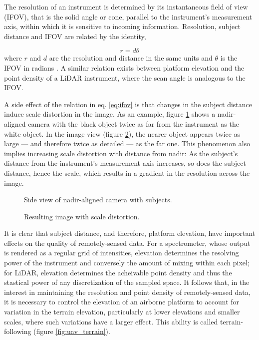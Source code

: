 \documentclass[10pt,a4paper]{report}
\begin{document}
The resolution of an instrument is determined by its instantaneous field of view (IFOV), that is the solid angle or cone, parallel to the instrument's measurement axis, within which it is sensitive to incoming information. Resolution, subject distance and IFOV are related by the identity, 

\begin{equation}
r = d \theta
\label{eq:ifov}
\end{equation} 
where $r$ and $d$ are the resolution and distance in the same units and $\theta$ is the IFOV in radians \cite{Lillesand1999}. A similar relation exists between platform elevation and the point density of a LiDAR instrument, where the scan angle is analogous to the IFOV. 

A side effect of the relation in eq. \ref{eq:ifov} is that changes in the subject distance induce scale distortion in the image. As an example, figure \ref{fig:scale_cam} shows a nadir-aligned camera with the black object twice as far from the instrument as the white object. In the image view (figure \ref{fig:scale_img}), the nearer object appears twice as large --- and therefore twice as detailed --- as the far one. This phenomenon also implies increasing scale distortion with distance from nadir: As the subject's distance from the instrument's measurement axis increases, so does the subject distance, hence the scale, which results in a gradient in the resolution across the image.

\begin{figure}
\centering
\def\svgscale{0.5}

\caption{Side view of nadir-aligned camera with subjects.}
\label{fig:scale_cam}
\end{figure}

\begin{figure}
\centering
\def\svgscale{0.5}

\caption{Resulting image with scale distortion.}
\label{fig:scale_img}
\end{figure}

It is clear that subject distance, and therefore, platform elevation, have important effects on the quality of remotely-sensed data. For a spectrometer, whose output is rendered as a regular grid of intensities, elevation determines the resolving power of the instrument and conversely the amount of mixing within each pixel; for LiDAR, elevation determines the acheivable point density and thus the stastical power of any discretization of the sampled space. It follows that, in the interest in maintaining the resolution and point density of remotely-sensed data, it is necessary to control the elevation of an airborne platform to account for variation in the terrain elevation, particularly at lower elevations and smaller scales, where such variations have a larger effect. This ability is called terrain-following (figure \ref{fig:uav_terrain}).
\end{document}

